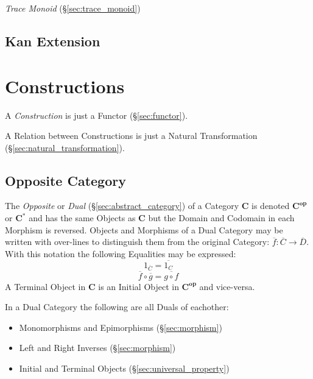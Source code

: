 \emph{Trace Monoid} (\S\ref{sec:trace_monoid})



\subsection{Kan Extension}\label{sec:kan_extension}



\section{Constructions}\label{sec:category_construction}

A \emph{Construction} is just a Functor (\S\ref{sec:functor}).

A Relation between Constructions is just a Natural Transformation
(\S\ref{sec:natural_transformation}).



\subsection{Opposite Category}\label{sec:opposite_category}

The \emph{Opposite} or \emph{Dual} (\S\ref{sec:abstract_category})
of a Category $\mathbf{C}$ is denoted $\mathbf{C^{op}}$ or
$\mathbf{C^*}$ and has the same Objects as $\mathbf{C}$ but the Domain
and Codomain in each Morphism is reversed. Objects and Morphisms of a
Dual Category may be written with over-lines to distinguish them from
the original Category: $\overline{f}: \overline{C} \rightarrow
\overline{D}$. With this notation the following Equalities may be
expressed:
\[
  1_{\overline{C}} = \overline{1_C}
\]\[
  \overline{f} \circ \overline{g} = \overline{g \circ f}
\]
A Terminal Object in $\mathbf{C}$ is an Initial Object in
$\mathbf{C^{op}}$ and vice-versa.

In a Dual Category the following are all Duals of eachother:
\begin{itemize}
  \item Monomorphisms and Epimorphisms (\S\ref{sec:morphism})
  \item Left and Right Inverses (\S\ref{sec:morphism})
  \item Initial and Terminal Objects (\S\ref{sec:universal_property})
\end{itemize}

